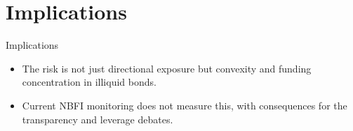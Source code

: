 \documentclass[aspectratio=169,11pt]{beamer}
\begin{document}
\section{Implications}
\begin{frame}{Implications}
  \begin{itemize}
    \item The risk is not just directional exposure but convexity and funding concentration in illiquid bonds.
    \item Current NBFI monitoring does not measure this, with consequences for the transparency and leverage debates.
  \end{itemize}
\end{frame}
\end{document}
